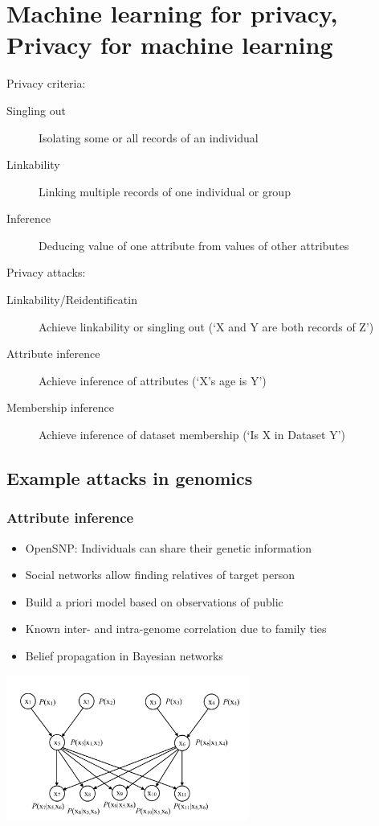 \documentclass[a4paper]{scrreprt}
\begin{document}
\chapter{Machine learning for privacy, Privacy for machine learning}

Privacy criteria:
\begin{description}
		\item[Singling out] Isolating some or all records of an individual
		\item[Linkability] Linking multiple records of one individual or group
		\item[Inference] Deducing value of one attribute from values of other
				attributes
\end{description}

Privacy attacks:
\begin{description}
		\item[Linkability/Reidentificatin] Achieve linkability or singling out (`X and Y are both records of Z')
		\item[Attribute inference] Achieve inference of attributes (`X's age is Y')
		\item[Membership inference] Achieve inference of dataset membership (`Is X in Dataset Y')
\end{description}

\section{Example attacks in genomics}

\subsection{Attribute inference}

\begin{itemize}
		\item OpenSNP: Individuals can share their genetic information
		\item Social networks allow finding relatives of target person
		\item Build a priori model based on observations of public
		\item Known inter- and intra-genome correlation due to family ties
		\item Belief propagation in Bayesian networks
\end{itemize}

\includegraphics[width=0.6\textwidth]{resources/8_bayesian_network}
\end{document}
